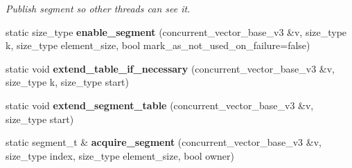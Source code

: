 \begin{DoxyCompactItemize}
\begin{DoxyCompactList}\small\item\em Publish segment so other threads can see it. \end{DoxyCompactList}\item 
\hypertarget{classtbb_1_1internal_1_1concurrent__vector__base__v3_1_1helper_aaa6b8fda2720bafd919c7df8d5568a21}{}static size\+\_\+type {\bfseries enable\+\_\+segment} (concurrent\+\_\+vector\+\_\+base\+\_\+v3 \&v, size\+\_\+type k, size\+\_\+type element\+\_\+size, bool mark\+\_\+as\+\_\+not\+\_\+used\+\_\+on\+\_\+failure=false)\label{classtbb_1_1internal_1_1concurrent__vector__base__v3_1_1helper_aaa6b8fda2720bafd919c7df8d5568a21}

\item 
\hypertarget{classtbb_1_1internal_1_1concurrent__vector__base__v3_1_1helper_a590ab0cbfcc483109fb960f8a46582cd}{}static void {\bfseries extend\+\_\+table\+\_\+if\+\_\+necessary} (concurrent\+\_\+vector\+\_\+base\+\_\+v3 \&v, size\+\_\+type k, size\+\_\+type start)\label{classtbb_1_1internal_1_1concurrent__vector__base__v3_1_1helper_a590ab0cbfcc483109fb960f8a46582cd}

\item 
\hypertarget{classtbb_1_1internal_1_1concurrent__vector__base__v3_1_1helper_af34163bf84fb94d9e824679f644e6873}{}static void {\bfseries extend\+\_\+segment\+\_\+table} (concurrent\+\_\+vector\+\_\+base\+\_\+v3 \&v, size\+\_\+type start)\label{classtbb_1_1internal_1_1concurrent__vector__base__v3_1_1helper_af34163bf84fb94d9e824679f644e6873}

\item 
\hypertarget{classtbb_1_1internal_1_1concurrent__vector__base__v3_1_1helper_a120ea3a0581ced46f0ee33e6ad7fc060}{}static segment\+\_\+t \& {\bfseries acquire\+\_\+segment} (concurrent\+\_\+vector\+\_\+base\+\_\+v3 \&v, size\+\_\+type index, size\+\_\+type element\+\_\+size, bool owner)\label{classtbb_1_1internal_1_1concurrent__vector__base__v3_1_1helper_a120ea3a0581ced46f0ee33e6ad7fc060}

\end{DoxyCompactItemize}
